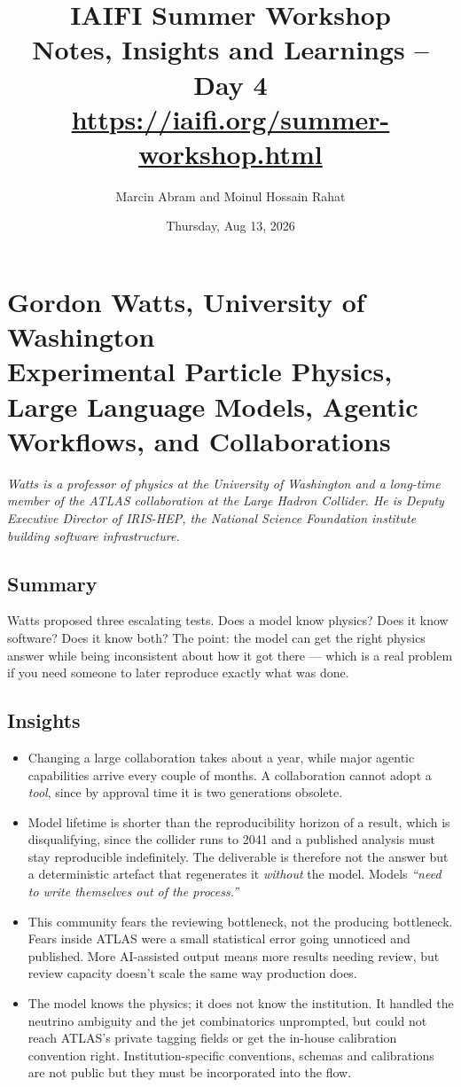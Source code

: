 \documentclass[11pt]{article}
\title{IAIFI Summer Workshop\\[12pt]
\large{Notes, Insights and Learnings -- Day 4}\\[3pt]
\large{\url{https://iaifi.org/summer-workshop.html}}}
\author{Marcin Abram and Moinul Hossain Rahat}
\date{Thursday, Aug 13, 2026}
\begin{document}
\maketitle

\section{Gordon Watts, University of Washington\\
{\large Experimental Particle Physics, Large Language Models, Agentic Workflows, and Collaborations}}

\emph{Watts is a professor of physics at the University of Washington and a long-time member of the ATLAS collaboration at the Large Hadron Collider. He is Deputy Executive Director of IRIS-HEP, the National Science Foundation institute building software infrastructure.}

\subsection*{Summary}
Watts proposed three escalating tests. Does a model know physics? Does it know software? Does it know both? The point: the model can get the right physics answer while being inconsistent about how it got there — which is a real problem if you need someone to later reproduce exactly what was done.

\subsection*{Insights}
\begin{itemize}
    \item Changing a large collaboration takes about a year, while major agentic capabilities arrive every couple of months. A collaboration cannot adopt a \emph{tool}, since by approval time it is two generations obsolete.
    \item Model lifetime is shorter than the reproducibility horizon of a result, which is disqualifying, since the collider runs to 2041 and a published analysis must stay reproducible indefinitely. The deliverable is therefore not the answer but a deterministic artefact that regenerates it \emph{without} the model. Models \emph{``need to write themselves out of the process.''}
    \item This community fears the reviewing bottleneck, not the producing bottleneck. Fears inside ATLAS were a small statistical error going unnoticed and published. More AI-assisted output means more results needing review, but review capacity doesn't scale the same way production does.
    \item The model knows the physics; it does not know the institution. It handled the neutrino ambiguity and the jet combinatorics unprompted, but could not reach ATLAS's private tagging fields or get the in-house calibration convention right. Institution-specific conventions, schemas and calibrations are not public but they must be incorporated into the flow.
\end{itemize}
\end{document}

